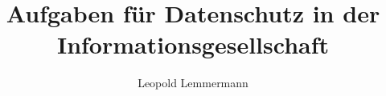 \documentclass{exercisesheet}
\title{Aufgaben für Datenschutz in der Informationsgesellschaft}
\author{Leopold Lemmermann}
\begin{document}
\createtitle
\end{document}
